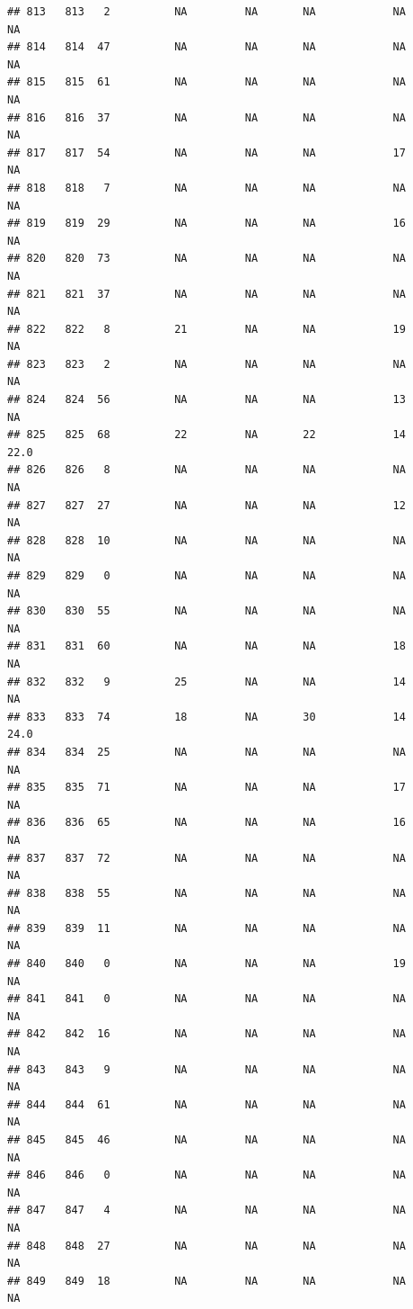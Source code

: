 \documentclass[man]{apa6}
\begin{document}
\begin{verbatim}
## 813   813   2          NA         NA       NA            NA       NA
## 814   814  47          NA         NA       NA            NA       NA
## 815   815  61          NA         NA       NA            NA       NA
## 816   816  37          NA         NA       NA            NA       NA
## 817   817  54          NA         NA       NA            17       NA
## 818   818   7          NA         NA       NA            NA       NA
## 819   819  29          NA         NA       NA            16       NA
## 820   820  73          NA         NA       NA            NA       NA
## 821   821  37          NA         NA       NA            NA       NA
## 822   822   8          21         NA       NA            19       NA
## 823   823   2          NA         NA       NA            NA       NA
## 824   824  56          NA         NA       NA            13       NA
## 825   825  68          22         NA       22            14     22.0
## 826   826   8          NA         NA       NA            NA       NA
## 827   827  27          NA         NA       NA            12       NA
## 828   828  10          NA         NA       NA            NA       NA
## 829   829   0          NA         NA       NA            NA       NA
## 830   830  55          NA         NA       NA            NA       NA
## 831   831  60          NA         NA       NA            18       NA
## 832   832   9          25         NA       NA            14       NA
## 833   833  74          18         NA       30            14     24.0
## 834   834  25          NA         NA       NA            NA       NA
## 835   835  71          NA         NA       NA            17       NA
## 836   836  65          NA         NA       NA            16       NA
## 837   837  72          NA         NA       NA            NA       NA
## 838   838  55          NA         NA       NA            NA       NA
## 839   839  11          NA         NA       NA            NA       NA
## 840   840   0          NA         NA       NA            19       NA
## 841   841   0          NA         NA       NA            NA       NA
## 842   842  16          NA         NA       NA            NA       NA
## 843   843   9          NA         NA       NA            NA       NA
## 844   844  61          NA         NA       NA            NA       NA
## 845   845  46          NA         NA       NA            NA       NA
## 846   846   0          NA         NA       NA            NA       NA
## 847   847   4          NA         NA       NA            NA       NA
## 848   848  27          NA         NA       NA            NA       NA
## 849   849  18          NA         NA       NA            NA       NA

\end{verbatim}
\end{document}
